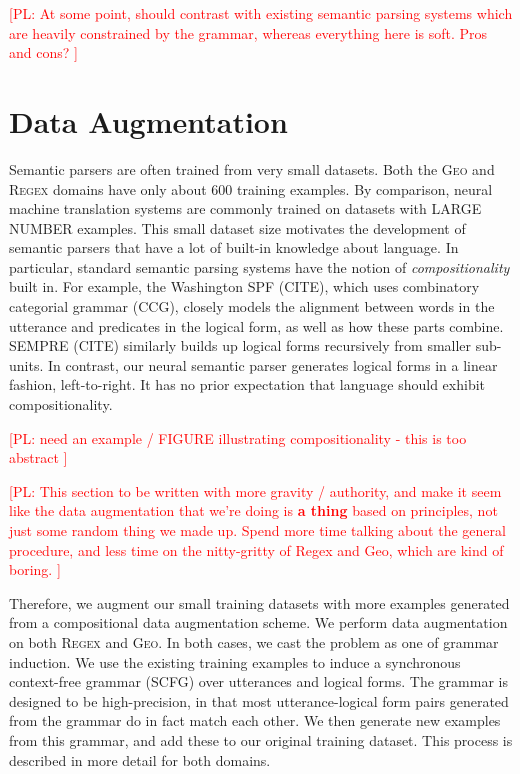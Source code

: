 \documentclass[11pt,letterpaper]{article}
\newcommand{\regex}{\textsc{Regex}\xspace}
\newcommand{\geo}{\textsc{Geo}\xspace}
\newcommand\pl[1]{\textcolor{red}{[PL: #1]}}
\begin{document}
\pl{
  At some point, should contrast with existing semantic parsing systems
  which are heavily constrained by the grammar, whereas everything here is soft.
  Pros and cons?
}

\section{Data Augmentation}
Semantic parsers are often trained from very small datasets.
Both the \geo and \regex domains have only about $600$ training examples.
By comparison, neural machine translation systems are commonly
trained on datasets with LARGE NUMBER examples.
This small dataset size motivates the development of semantic parsers
that have a lot of built-in knowledge about language.
In particular, standard semantic parsing systems have
the notion of \emph{compositionality} built in.
For example, the Washington SPF (CITE), 
which uses combinatory categorial grammar (CCG),
closely models the alignment between words in the utterance 
and predicates in the logical form, as well as how these parts
combine.  SEMPRE (CITE) similarly builds up logical forms
recursively from smaller sub-units.  In contrast,
our neural semantic parser generates logical forms in a linear fashion,
left-to-right.  It has no prior expectation that language should
exhibit compositionality.

\pl{need an example / FIGURE illustrating compositionality - this is too abstract
}

\pl{This section to be written with more gravity / authority,
  and make it seem like the data augmentation that we're doing is \textbf{a thing}
  based on principles, not just some random thing we made up.
  Spend more time talking about the general procedure,
  and less time on the nitty-gritty of Regex and Geo,
  which are kind of boring.
}

Therefore, we augment our small training datasets with 
more examples generated from a compositional data augmentation scheme.
We perform data augmentation on both \regex and \geo.
In both cases, we cast the problem as one of grammar induction.
We use the existing training examples to induce a
synchronous context-free grammar (SCFG) over utterances and logical forms.
The grammar is designed to be high-precision, 
in that most utterance-logical form pairs generated from the grammar
do in fact match each other.
We then generate new examples from this grammar,
and add these to our original training dataset.
This process is described in more detail for both domains.
\end{document}
